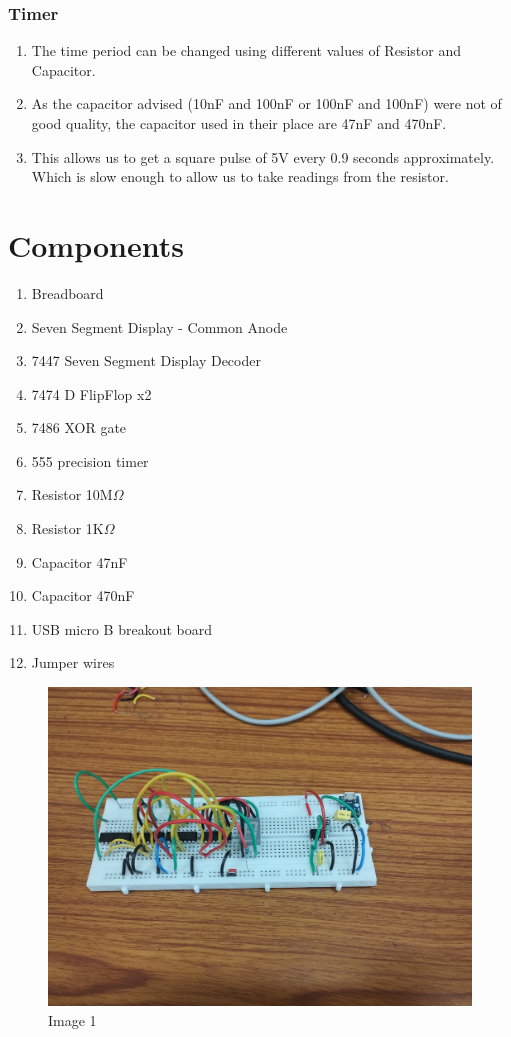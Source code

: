 \documentclass{article}
\begin{document}
\subsubsection*{Timer}
\begin{enumerate}
    \item The time period can be changed using different values of Resistor and Capacitor.
    \item As the capacitor advised (10nF and 100nF or 100nF and 100nF) were not of good quality, the capacitor used in their place are 47nF and 470nF.
    \item This allows us to get a square pulse of 5V every 0.9 seconds approximately. Which is slow enough to allow us to take readings from the resistor.
\end{enumerate}

 

\section*{Components}
\begin{enumerate}
    \item Breadboard
    \item Seven Segment Display - Common Anode
    \item 7447 Seven Segment Display Decoder
    \item 7474 D FlipFlop x2
    \item 7486 XOR gate
    \item 555 precision timer
    \item Resistor 10M$\Omega$
    \item Resistor 1K$\Omega$
    \item Capacitor 47nF
    \item Capacitor 470nF
    \item USB micro B breakout board
    \item Jumper wires
\end{enumerate}

\begin{figure}[ht]
	\centering
	\includegraphics[width=0.7\linewidth]{figs/1.jpg}
	\caption{Image 1}
	\label{fig:view}
\end{figure}
\FloatBarrier
\end{document}
